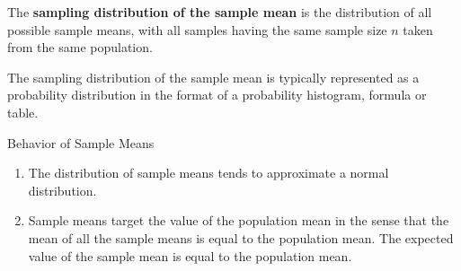 \documentclass{beamer}
\begin{document}
\begin{frame}
\begin{definition}
The \textbf{sampling distribution of the sample mean} is the distribution of all possible sample means, with all samples having the same sample size $n$ taken from the same population.
\end{definition}\pause

\begin{note}
The sampling distribution of the sample mean is typically represented as a probability distribution in the format of a probability histogram, formula or table.
\end{note}\pause

\begin{block}{Behavior of Sample Means}
\begin{enumerate}
\item<3-> The distribution of sample means tends to approximate a normal distribution.
\item<4-> Sample means target the value of the population mean in the sense that the mean of all the sample means is equal to the population mean. The expected value of the sample mean is equal to the population mean.
\end{enumerate}
\end{block}
\end{frame}
\end{document}

